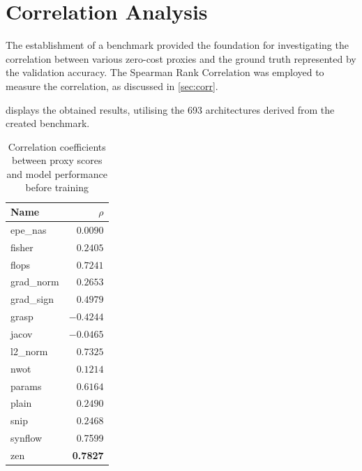 \section{Correlation Analysis}\label{res:correlation}

The establishment of a benchmark provided the foundation for investigating the correlation between various zero-cost proxies and the ground truth represented by the validation accuracy. The Spearman Rank Correlation was employed to measure the correlation, as discussed in \cref{sec:corr}. 

 displays the obtained results, utilising the 693 architectures derived from the created benchmark. 
\clearpage

\begin{table}[h]
\caption{Correlation coefficients between proxy scores and model performance before training}
\centering
\begin{tabular}{lr}
\textbf{Name} & \textbf{$\rho$} \\ \hline
\multicolumn{1}{l|}{\cellcolor{verylightgray}epe\_nas} & \cellcolor{verylightgray}$0.0090$ \\
\multicolumn{1}{l|}{fisher} & $0.2405$ \\
\multicolumn{1}{l|}{\cellcolor{verylightgray}flops} & \cellcolor{verylightgray}$0.7241$ \\
\multicolumn{1}{l|}{grad\_norm} & $0.2653$ \\
\multicolumn{1}{l|}{\cellcolor{verylightgray}grad\_sign} & \cellcolor{verylightgray}$0.4979$ \\
\multicolumn{1}{l|}{grasp} & $-0.4244$ \\
\multicolumn{1}{l|}{\cellcolor{verylightgray}jacov} & \cellcolor{verylightgray}$-0.0465$ \\
\multicolumn{1}{l|}{l2\_norm} & $0.7325$ \\
\multicolumn{1}{l|}{\cellcolor{verylightgray}nwot} & \cellcolor{verylightgray}$0.1214$ \\
\multicolumn{1}{l|}{params} & $0.6164$ \\
\multicolumn{1}{l|}{\cellcolor{verylightgray}plain} & \cellcolor{verylightgray}$0.2490$ \\
\multicolumn{1}{l|}{snip} & $0.2468$ \\
\multicolumn{1}{l|}{\cellcolor{verylightgray}synflow} & \cellcolor{verylightgray}0.7599 \\
\multicolumn{1}{l|}{zen} & \textbf{0.7827} \\
\end{tabular}
\label{tab:corr}
\end{table}

